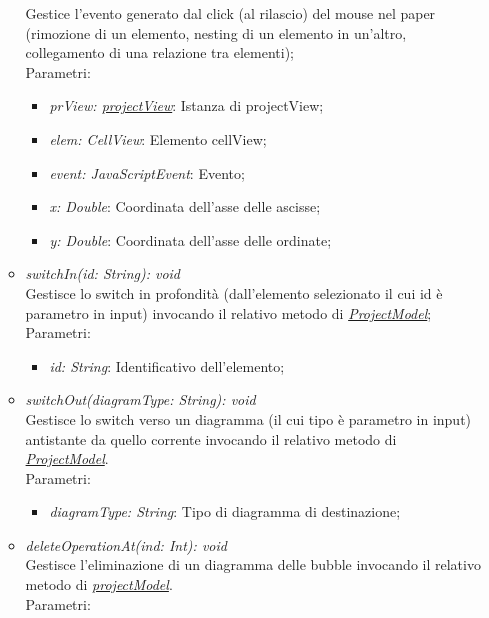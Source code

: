 \documentclass[../DefinizioneDiProdotto.tex]{subfiles}
\begin{document}
\begin{itemize}
\begin{itemize}
							Gestice l'evento generato dal click (al rilascio) del mouse nel paper (rimozione di un elemento, nesting di un elemento in un'altro, collegamento di una relazione tra elementi);\\
							Parametri:
							\begin{itemize}
								\item \emph{prView: \hyperlink{SWEDesigner::Client::View::projectView}{\emph{projectView}}}: Istanza di projectView;
								\item \emph{elem: CellView}: Elemento cellView;
								\item \emph{event: JavaScriptEvent}: Evento;
								\item \emph{x: Double}: Coordinata dell'asse delle ascisse;
								\item \emph{y: Double}: Coordinata dell'asse delle ordinate;
							\end{itemize}
							\item \emph{switchIn(id: String): void} \\
							Gestisce lo switch in profondità (dall'elemento selezionato il cui id è parametro in input) invocando il relativo metodo di \hyperlink{SWEDesigner::Model::ProjectModel}{\emph{ProjectModel}};\\
							Parametri:
							\begin{itemize}
								\item \emph{id: String}: Identificativo dell'elemento;
							\end{itemize}
							\item \emph{switchOut(diagramType: String): void} \\
							Gestisce lo switch verso un diagramma (il cui tipo è parametro in input) antistante da quello corrente invocando il relativo metodo di \hyperlink{SWEDesigner::Model::ProjectModel}{\emph{ProjectModel}}.\\
							Parametri:
							\begin{itemize}
								\item \emph{diagramType: String}: Tipo di diagramma di destinazione;
							\end{itemize}
							\item \emph{deleteOperationAt(ind: Int): void} \\
							Gestisce l'eliminazione di un diagramma delle bubble invocando il relativo metodo di \hyperlink{SWEDesigner::Model::projectModel}{\emph{projectModel}}.\\
							Parametri:
							\begin{itemize}

\end{itemize}
\end{itemize}
\end{itemize}
\end{document}
